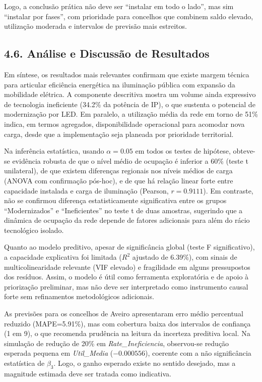 Logo, a conclusão prática não deve ser ``instalar em todo o lado'', mas sim ``instalar por fases'', com prioridade para concelhos que combinem saldo elevado, utilização moderada e intervalos de previsão mais estreitos.

\subsection{4.6. Análise e Discussão de Resultados}

Em síntese, os resultados mais relevantes confirmam que existe margem técnica para articular eficiência energética na iluminação pública com expansão da mobilidade elétrica. A componente descritiva mostra um volume ainda expressivo de tecnologia ineficiente (34.2\% da potência de IP), o que sustenta o potencial de modernização por LED. Em paralelo, a utilização média da rede em torno de 51\% indica, em termos agregados, disponibilidade operacional para acomodar nova carga, desde que a implementação seja planeada por prioridade territorial.

Na inferência estatística, usando \(\alpha=0.05\) em todos os testes de hipótese, obteve-se evidência robusta de que o nível médio de ocupação é inferior a 60\% (teste t unilateral), de que existem diferenças regionais nos níveis médios de carga (ANOVA com confirmação pós-hoc), e de que há relação linear forte entre capacidade instalada e carga de iluminação (Pearson, \(r=0.9111\)). Em contraste, não se confirmou diferença estatisticamente significativa entre os grupos ``Modernizados'' e ``Ineficientes'' no teste t de duas amostras, sugerindo que a dinâmica de ocupação da rede depende de fatores adicionais para além do rácio tecnológico isolado.

Quanto ao modelo preditivo, apesar de significância global (teste F significativo), a capacidade explicativa foi limitada (\(R^2\) ajustado de 6.39\%), com sinais de multicolinearidade relevante (VIF elevado) e fragilidade em alguns pressupostos dos resíduos. Assim, o modelo é útil como ferramenta exploratória e de apoio à priorização preliminar, mas não deve ser interpretado como instrumento causal forte sem refinamentos metodológicos adicionais.

As previsões para os concelhos de Aveiro apresentaram erro médio percentual reduzido (MAPE=5.91\%), mas com cobertura baixa dos intervalos de confiança (1 em 9), o que recomenda prudência na leitura da incerteza preditiva local. Na simulação de redução de 20\% em \textit{Rate\_Ineficiencia}, observou-se redução esperada pequena em \textit{Util\_Media} (\(-0.000556\)), coerente com a não significância estatística de \(\beta_3\). Logo, o ganho esperado existe no sentido desejado, mas a magnitude estimada deve ser tratada como indicativa.

